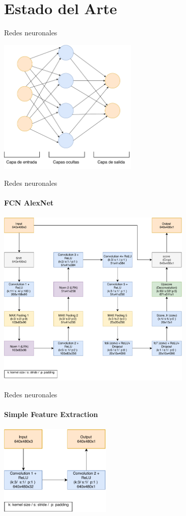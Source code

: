 \section{Estado del Arte}

\begin{frame}{Redes neuronales}

	\centering
 \includegraphics[width=0.5\textwidth]{fig/redneuronal.pdf}

\end{frame}

\begin{frame}{Redes neuronales}
\framesubtitle{FCN AlexNet}

	\centering
 \includegraphics[width=0.7\textwidth]{anexo/FCN-Alex.pdf}
\end{frame}

\begin{frame}{Redes neuronales}
\framesubtitle{Simple Feature Extraction}
	\centering
 \includegraphics[width=0.4\textwidth]{anexo/sfe.pdf}
\end{frame}

